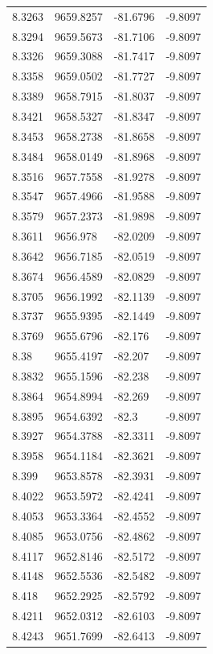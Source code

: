 \begin{table}[H]
\begin{tabular}{llll}
8.3263 & 9659.8257 & -81.6796 & -9.8097 \\
8.3294 & 9659.5673 & -81.7106 & -9.8097 \\
8.3326 & 9659.3088 & -81.7417 & -9.8097 \\
8.3358 & 9659.0502 & -81.7727 & -9.8097 \\
8.3389 & 9658.7915 & -81.8037 & -9.8097 \\
8.3421 & 9658.5327 & -81.8347 & -9.8097 \\
8.3453 & 9658.2738 & -81.8658 & -9.8097 \\
8.3484 & 9658.0149 & -81.8968 & -9.8097 \\
8.3516 & 9657.7558 & -81.9278 & -9.8097 \\
8.3547 & 9657.4966 & -81.9588 & -9.8097 \\
8.3579 & 9657.2373 & -81.9898 & -9.8097 \\
8.3611 & 9656.978 & -82.0209 & -9.8097 \\
8.3642 & 9656.7185 & -82.0519 & -9.8097 \\
8.3674 & 9656.4589 & -82.0829 & -9.8097 \\
8.3705 & 9656.1992 & -82.1139 & -9.8097 \\
8.3737 & 9655.9395 & -82.1449 & -9.8097 \\
8.3769 & 9655.6796 & -82.176 & -9.8097 \\
8.38 & 9655.4197 & -82.207 & -9.8097 \\
8.3832 & 9655.1596 & -82.238 & -9.8097 \\
8.3864 & 9654.8994 & -82.269 & -9.8097 \\
8.3895 & 9654.6392 & -82.3 & -9.8097 \\
8.3927 & 9654.3788 & -82.3311 & -9.8097 \\
8.3958 & 9654.1184 & -82.3621 & -9.8097 \\
8.399 & 9653.8578 & -82.3931 & -9.8097 \\
8.4022 & 9653.5972 & -82.4241 & -9.8097 \\
8.4053 & 9653.3364 & -82.4552 & -9.8097 \\
8.4085 & 9653.0756 & -82.4862 & -9.8097 \\
8.4117 & 9652.8146 & -82.5172 & -9.8097 \\
8.4148 & 9652.5536 & -82.5482 & -9.8097 \\
8.418 & 9652.2925 & -82.5792 & -9.8097 \\
8.4211 & 9652.0312 & -82.6103 & -9.8097 \\
8.4243 & 9651.7699 & -82.6413 & -9.8097 \\

\end{tabular}
\end{table}
